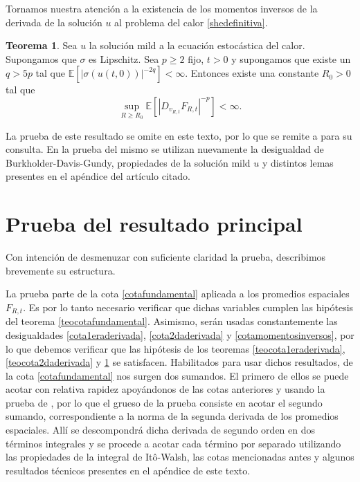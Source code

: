 \documentclass[letterpaper,twoside,12pt]{book}
\newcommand{\E}{\mathbb{E}}
\newcommand{\1}{\mathds{1}}
\newcommand{\abs}[1]{\left\lvert #1 \right\rvert}
\theoremstyle{definition}
\theoremstyle{definition}
\newtheorem{teo}{Teorema}
\theoremstyle{remark}
\theoremstyle{definition}
\theoremstyle{definition}
\theoremstyle{definition}
\theoremstyle{definition}
\theoremstyle{definition}
\begin{document}
   Tornamos nuestra atención a la existencia de los momentos inversos de la derivada de la solución $u$ al problema del calor \eqref{shedefinitiva}.
\begin{teo}\label{teocotamomentosinversos}
   Sea $u$ la solución mild a la ecuación estocástica del calor. Supongamos que $\sigma$ es Lipschitz. Sea $p\geq2$ fijo, $t>0$ y supongamos que existe un $q>5p$ tal que $\E\left[\abs{\sigma(u(t,0))}^{-2q}\right]<\infty$. Entonces existe una constante $R_0>0$ tal que 
   \begin{equation}\label{cotamomentosinversos}
      \sup_{R\geq R_0}\E\left[\abs{D_{v_{R,t}}F_{R,t}}^{-p}\right]<\infty.
   \end{equation}
   
   \end{teo}
   La prueba de este resultado se omite en este texto, por lo que se remite a \cite[proposición 4.2]{KUZGUN202268} para su consulta. En la prueba del mismo se utilizan nuevamente la desigualdad de Burkholder-Davis-Gundy, propiedades de la solución mild $u$ y distintos lemas presentes en el apéndice del artículo citado.

\section{Prueba del resultado principal}
Con intención de desmenuzar con suficiente claridad la prueba, describimos brevemente su estructura.

La prueba parte de la cota \eqref{cotafundamental} aplicada a los promedios espaciales $F_{R,t}$. Es por lo tanto necesario verificar que dichas variables cumplen las hipótesis del teorema \ref{teocotafundamental}. Asimismo, serán usadas constantemente las desigualdades \eqref{cota1eraderivada}, \eqref{cota2daderivada} y \eqref{cotamomentosinversos}, por lo que debemos verificar que las hipótesis de los teoremas \ref{teocota1eraderivada}, \ref{teocota2daderivada} y \ref{teocotamomentosinversos} se satisfacen. Habilitados para usar dichos resultados, de la cota \eqref{cotafundamental} nos surgen dos sumandos. El primero de ellos se puede acotar con relativa rapidez apoyándonos de las cotas anteriores y usando la prueba de \cite[teorema 1.1]{HUANG20207170}, por lo que el grueso de la prueba consiste en acotar el segundo sumando, correspondiente a la norma de la segunda derivada de los promedios espaciales. Allí se descompondrá dicha derivada de segundo orden en dos términos integrales y se procede a acotar cada término por separado utilizando las propiedades de la integral de Itô-Walsh, las cotas mencionadas antes y algunos resultados técnicos presentes en el apéndice de este texto.
\end{document}
